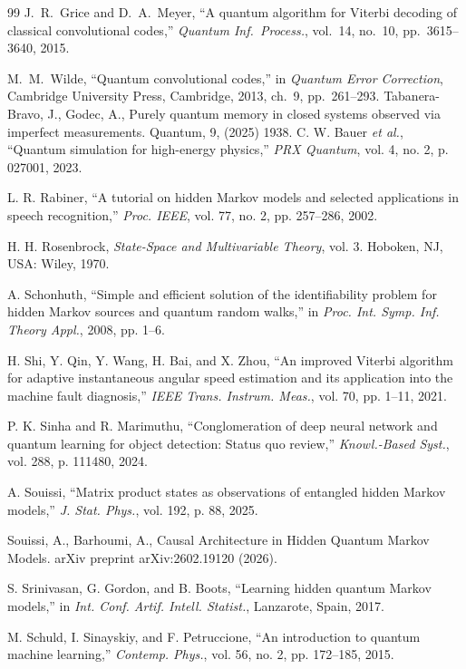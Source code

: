 \documentclass[12pt, reco]{article}
\begin{document}
\begin{thebibliography}{99}
J.~R.~Grice and D.~A.~Meyer,
``A quantum algorithm for Viterbi decoding of classical convolutional codes,''
\emph{Quantum Inf.\ Process.}, vol.~14, no.~10, pp.~3615--3640, 2015.

M.~M.~Wilde,
``Quantum convolutional codes,''
in \emph{Quantum Error Correction},
Cambridge University Press, Cambridge, 2013, ch.~9, pp.~261--293. 
    Tabanera-Bravo, J., Godec, A., Purely quantum memory in closed systems observed via imperfect measurements. Quantum, 9,  (2025) 1938.
C. W. Bauer \emph{et al.}, ``Quantum simulation for high-energy physics,'' \emph{PRX Quantum}, vol. 4, no. 2, p. 027001, 2023.

L. R. Rabiner, ``A tutorial on hidden Markov models and selected applications in speech recognition,'' \emph{Proc. IEEE}, vol. 77, no. 2, pp. 257--286, 2002.

H. H. Rosenbrock, \emph{State-Space and Multivariable Theory}, vol. 3. Hoboken, NJ, USA: Wiley, 1970.

A. Schonhuth, ``Simple and efficient solution of the identifiability problem for hidden Markov sources and quantum random walks,'' in \emph{Proc. Int. Symp. Inf. Theory Appl.}, 2008, pp. 1--6.

H. Shi, Y. Qin, Y. Wang, H. Bai, and X. Zhou, ``An improved Viterbi algorithm for adaptive instantaneous angular speed estimation and its application into the machine fault diagnosis,'' \emph{IEEE Trans. Instrum. Meas.}, vol. 70, pp. 1--11, 2021.

P. K. Sinha and R. Marimuthu, ``Conglomeration of deep neural network and quantum learning for object detection: Status quo review,'' \emph{Knowl.-Based Syst.}, vol. 288, p. 111480, 2024.

A. Souissi, ``Matrix product states as observations of entangled hidden Markov models,'' \emph{J. Stat. Phys.}, vol. 192, p. 88, 2025.

 Souissi, A.,  Barhoumi, A., Causal Architecture in Hidden Quantum Markov Models. arXiv preprint arXiv:2602.19120 (2026).

S. Srinivasan, G. Gordon, and B. Boots, ``Learning hidden quantum Markov models,'' in \emph{Int. Conf. Artif. Intell. Statist.}, Lanzarote, Spain, 2017.

M. Schuld, I. Sinayskiy, and F. Petruccione, ``An introduction to quantum machine learning,'' \emph{Contemp. Phys.}, vol. 56, no. 2, pp. 172--185, 2015.


\end{thebibliography}
\end{document}
